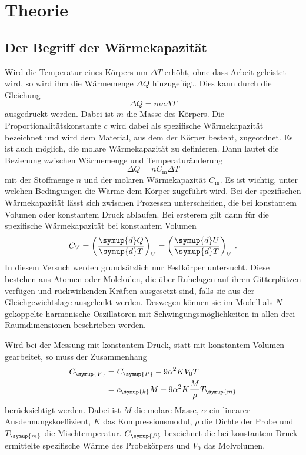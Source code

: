 \section{Theorie}
\label{sec:Theorie}
\subsection{Der Begriff der Wärmekapazität}
Wird die Temperatur eines Körpers um $\Delta T$ erhöht, ohne dass Arbeit geleistet
wird, so wird ihm die Wärmemenge $\Delta Q$ hinzugefügt. Dies kann durch die Gleichung
\begin{equation}
  \Delta Q = m c \Delta T
  \label{eqn:specificheat}
\end{equation}
ausgedrückt werden. Dabei ist $m$ die Masse des Körpers. Die Proportionalitätskonstante
$c$ wird dabei als spezifische Wärmekapazität bezeichnet und wird dem Material,
aus dem der Körper besteht, zugeordnet. \newline
Es ist auch möglich, die molare Wärmekapazität zu definieren. Dann lautet die
Beziehung zwischen Wärmemenge und Temperaturänderung
\begin{equation}
  \Delta Q = n C_\text{m} \Delta T
  \label{eqn:molarheat}
\end{equation}
mit der Stoffmenge $n$ und der molaren Wärmekapazität $C_\text{m}$. \newline
Es ist wichtig, unter welchen Bedingungen die Wärme dem Körper zugeführt wird.
Bei der spezifischen Wärmekapazität lässt sich zwischen Prozessen unterscheiden,
die bei konstantem Volumen oder konstantem Druck ablaufen. Bei ersterem gilt
dann für die spezifische Wärmekapazität bei konstantem Volumen
\begin{equation}
  C_V = \left(\frac{\symup{d}Q}{\symup{d}T}\right)_V = \left(\frac{\symup{d}U}{\symup{d}T}\right)_V\,.
  \label{eqn:cv}
\end{equation}
In diesem Versuch werden grundsätzlich nur Festkörper untersucht. Diese bestehen
aus Atomen oder Molekülen, die über Ruhelagen auf ihren Gitterplätzen verfügen und
rückwirkenden Kräften ausgesetzt sind, falls sie aus der Gleichgewichtslage ausgelenkt
werden. Deswegen können sie im Modell als $N$ gekoppelte harmonische Oszillatoren
mit Schwingungsmöglichkeiten in allen drei Raumdimensionen beschrieben werden.

Wird bei der Messung mit konstantem Druck, statt mit konstantem Volumen gearbeitet,
so muss der Zusammenhang
\begin{align}
  C_{\symup{V}}&= C_{\symup{P}} -9\alpha^2 K V_0 T \\
  &=c_{\symup{k}}M-9\alpha^2 K\frac{M}{\rho}T_{\symup{m}}
  \label{eqn:druckvolumen}
\end{align}
berücksichtigt werden. Dabei ist $M$ die molare Masse, $\alpha$ ein linearer Ausdehnungskoeffizient,
$K$ das Kompressionsmodul, $\rho$ die Dichte der Probe und $T_{\symup{m}}$ die Mischtemperatur.
$C_{\symup{P}}$ bezeichnet die bei konstantem Druck ermittelte spezifische Wärme
des Probekörpers und $V_0$ das Molvolumen.


